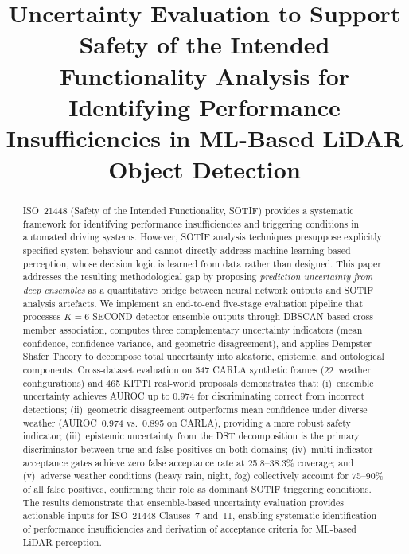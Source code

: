 \documentclass[conference]{IEEEtran}
\begin{document}
\title{Uncertainty Evaluation to Support Safety of the Intended Functionality Analysis for Identifying Performance Insufficiencies in ML-Based LiDAR Object Detection}

\author{
}

\maketitle


\begin{abstract}
ISO~21448 (Safety of the Intended Functionality, SOTIF) provides a systematic framework for identifying performance insufficiencies and triggering conditions in automated driving systems. However, SOTIF analysis techniques presuppose explicitly specified system behaviour and cannot directly address machine-learning-based perception, whose decision logic is learned from data rather than designed. This paper addresses the resulting methodological gap by proposing \emph{prediction uncertainty from deep ensembles} as a quantitative bridge between neural network outputs and SOTIF analysis artefacts. We implement an end-to-end five-stage evaluation pipeline that processes $K{=}6$ SECOND detector ensemble outputs through DBSCAN-based cross-member association, computes three complementary uncertainty indicators (mean confidence, confidence variance, and geometric disagreement), and applies Dempster-Shafer Theory to decompose total uncertainty into aleatoric, epistemic, and ontological components. Cross-dataset evaluation on 547 CARLA synthetic frames (22~weather configurations) and 465 KITTI real-world proposals demonstrates that: (i)~ensemble uncertainty achieves AUROC up to 0.974 for discriminating correct from incorrect detections; (ii)~geometric disagreement outperforms mean confidence under diverse weather (AUROC~0.974 vs.~0.895 on CARLA), providing a more robust safety indicator; (iii)~epistemic uncertainty from the DST decomposition is the primary discriminator between true and false positives on both domains; (iv)~multi-indicator acceptance gates achieve zero false acceptance rate at 25.8--38.3\% coverage; and (v)~adverse weather conditions (heavy rain, night, fog) collectively account for 75--90\% of all false positives, confirming their role as dominant SOTIF triggering conditions. The results demonstrate that ensemble-based uncertainty evaluation provides actionable inputs for ISO~21448 Clauses~7 and~11, enabling systematic identification of performance insufficiencies and derivation of acceptance criteria for ML-based LiDAR perception.
\end{abstract}
\end{document}
